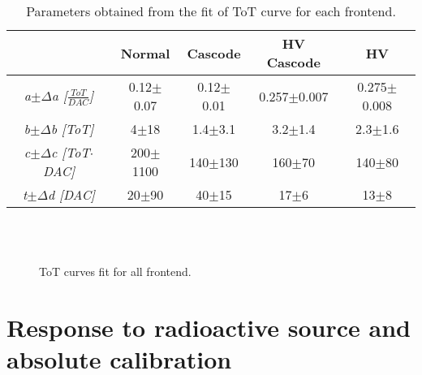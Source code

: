 \begin{table}[h!]
\centering
\begin{tabular}{c|c|c|c|c}
 & \textbf{Normal} & \textbf{Cascode} & \textbf{HV Cascode} & \textbf{HV} \\
\hline
\textit{a$\pm\Delta$a [$\frac{ToT}{DAC}$]} & 0.12$\pm$0.07 & 0.12$\pm$0.01 & 0.257$\pm$0.007 & 0.275$\pm$0.008 \\
\textit{b$\pm\Delta$b [ToT]} & 4$\pm$18 & 1.4$\pm$3.1 & 3.2$\pm$1.4 & 2.3$\pm$1.6 \\
\textit{c$\pm\Delta$c [ToT$\cdot$DAC]} & 200$\pm$1100 & 140$\pm$130 & 160$\pm$70 & 140$\pm$80 \\
\textit{t$\pm\Delta$d [DAC]} & 20$\pm$90 & 40$\pm$15 & 17$\pm$6 & 13$\pm$8 \\
\end{tabular}
\caption{Parameters obtained from the fit of ToT curve for each frontend.}
\label{tab:th_fe}
\end{table}

\begin{figure}[h!]
\centering
{}\quad
{}\\
\quad
{}\\
\caption{ToT curves fit for all frontend.}
\label{fig:tot_fe}
\end{figure}


\section{Response to radioactive source and absolute calibration} \label{source_ana}


